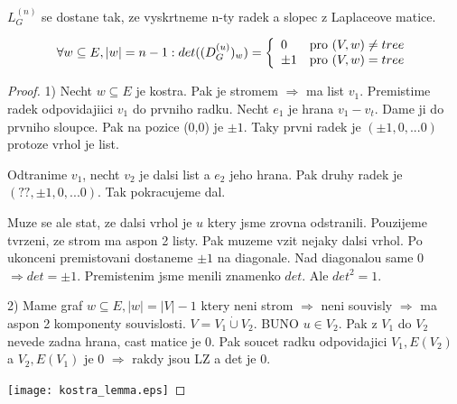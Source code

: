 \begin{definition}
	$ L^{(n)}_G $ se dostane tak, ze vyskrtneme n-ty radek a slopec z Laplaceove matice.
\end{definition}
\begin{lemma}
\[ \forall w \subseteq E, |w| = n - 1: det((D^{(u)}_G)_w) = \left\{ \begin{array}{ll} 0 & \mbox{pro } (V, w) \neq tree \\ \pm 1 & \mbox{pro }  (V,w) = tree \end{array} \right.  \]
\end{lemma}
\begin{proof}
	1) Necht $w \subseteq E$ je kostra. Pak je stromem $\Rightarrow$ ma list $v_1$. Premistime radek odpovidajiici $v_1$ do prvniho radku. Necht $e_1$ je hrana $v_1 - v_t$. Dame ji do prvniho sloupce.
	Pak na pozice (0,0) je $\pm 1$. Taky prvni radek je $(\pm 1, 0, ... 0)$ protoze vrhol je list.

	Odtranime $v_1$, necht $v_2$ je dalsi list a $e_2$ jeho hrana. Pak druhy radek je $(??, \pm 1, 0, ... 0)$. Tak pokracujeme dal.

	Muze se ale stat, ze dalsi vrhol je $u$ ktery jsme zrovna odstranili. Pouzijeme tvrzeni, ze strom ma aspon 2 listy. Pak muzeme vzit nejaky dalsi vrhol. Po ukonceni premistovani dostaneme $\pm 1$ na diagonale. Nad diagonalou same 0 $\Rightarrow det = \pm 1$. Premistenim jsme menili znamenko $det$. Ale $det^2 = 1$.

	2) Mame graf $w \subseteq E, |w| = |V| - 1$ ktery neni strom $\Rightarrow$ neni souvisly $\Rightarrow$ ma aspon 2 komponenty souvislosti. $V = V_1 \mathbin{\dot{\cup}} V_2$.
	BUNO $u \in V_2$. Pak z $V_1$ do $V_2$ nevede zadna hrana, cast matice je 0. Pak soucet radku odpovidajici $V_1, E(V_2)$ a $V_2, E(V_1)$ je 0 $\Rightarrow$ rakdy jsou LZ a det je 0.

	\texttt{[image: kostra\_lemma.eps]}
\end{proof}

